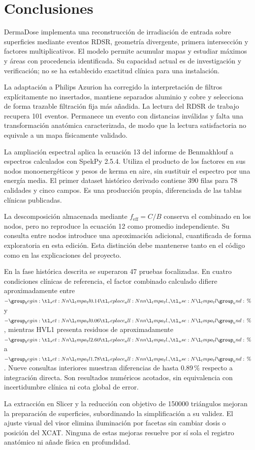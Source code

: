 \chapter{Conclusiones}
DermaDose implementa una reconstrucción de irradiación de entrada sobre superficies mediante eventos RDSR, geometría divergente, primera intersección y factores multiplicativos. El modelo permite acumular mapas y estudiar máximos y áreas con procedencia identificada. Su capacidad actual es de investigación y verificación; no se ha establecido exactitud clínica para una instalación.

La adaptación a Philips Azurion ha corregido la interpretación de filtros explícitamente no insertados, mantiene separados aluminio y cobre y selecciona de forma trazable filtración fija más añadida. La lectura del RDSR de trabajo recupera 101 eventos. Permanece un evento con distancias inválidas y falta una transformación anatómica caracterizada, de modo que la lectura satisfactoria no equivale a un mapa físicamente validado.

La ampliación espectral aplica la ecuación 13 del informe de Benmakhlouf a espectros calculados con SpekPy 2.5.4. Utiliza el producto de los factores en sus nodos monoenergéticos y pesos de kerma en aire, sin sustituir el espectro por una energía media. El primer dataset histórico derivado contiene 390 filas para 78 calidades y cinco campos. Es una producción propia, diferenciada de las tablas clínicas publicadas.

La descomposición almacenada mediante $f_{\mathrm{eff}}=C/B$ conserva el combinado en los nodos, pero no reproduce la ecuación 12 como promedio independiente. Su consulta entre nodos introduce una aproximación adicional, cuantificada de forma exploratoria en esta edición. Esta distinción debe mantenerse tanto en el código como en las explicaciones del proyecto.

En la fase histórica descrita se superaron 47 pruebas focalizadas. En cuatro condiciones clínicas de referencia, el factor combinado calculado difiere aproximadamente entre $-\num{0.14}\,\text{\char37}$ y $-\num{0.06}\,\text{\char37}$, mientras HVL1 presenta residuos de aproximadamente $-\num{2.60}\,\text{\char37}$ a $-\num{1.78}\,\text{\char37}$. Nueve consultas interiores muestran diferencias de hasta \num{0.89}\,\% respecto a integración directa. Son resultados numéricos acotados, sin equivalencia con incertidumbre clínica ni cota global de error.

La extracción en Slicer y la reducción con objetivo de \num{150000} triángulos mejoran la preparación de superficies, subordinando la simplificación a su validez. El ajuste visual del visor elimina iluminación por facetas sin cambiar dosis o posición del XCAT. Ninguna de estas mejoras resuelve por sí sola el registro anatómico ni añade física en profundidad.

